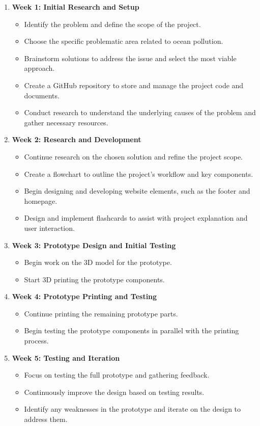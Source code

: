 \begin{enumerate}[1.]
    \item \textbf{Week 1: Initial Research and Setup}
    \begin{itemize}
        \item Identify the problem and define the scope of the project.
        \item Choose the specific problematic area related to ocean pollution.
        \item Brainstorm solutions to address the issue and select the most viable approach.
        \item Create a GitHub repository to store and manage the project code and documents.
        \item Conduct research to understand the underlying causes of the problem and gather necessary resources.
    \end{itemize}

\item \textbf{Week 2: Research and Development}
    \begin{itemize}
        \item Continue research on the chosen solution and refine the project scope.
        \item Create a flowchart to outline the project’s workflow and key components.
        \item Begin designing and developing website elements, such as the footer and homepage.
        \item Design and implement flashcards to assist with project explanation and user interaction.
    \end{itemize}
    
    \item \textbf{Week 3: Prototype Design and Initial Testing}
    \begin{itemize}
        \item Begin work on the 3D model for the prototype.
        \item Start 3D printing the prototype components.
    \end{itemize}

    \item \textbf{Week 4: Prototype Printing and Testing}
    \begin{itemize}
        \item Continue printing the remaining prototype parts.
        \item Begin testing the prototype components in parallel with the printing process.
    \end{itemize}

    \item \textbf{Week 5: Testing and Iteration}
    \begin{itemize}
        \item Focus on testing the full prototype and gathering feedback.
        \item Continuously improve the design based on testing results.
        \item Identify any weaknesses in the prototype and iterate on the design to address them.
    \end{itemize}
\end{enumerate}

